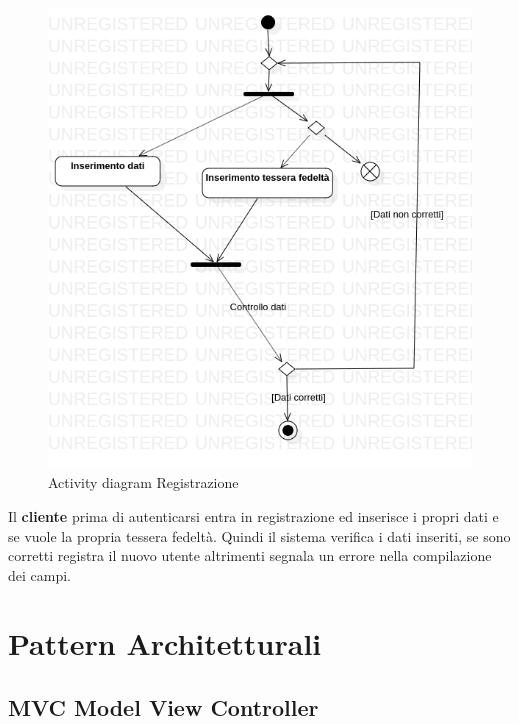 \documentclass[12pt, a4paper]{report}
\begin{document}
\begin{figure}[H]
  \centering
  \includegraphics[width=\textwidth]{Use Case Model!Registrazione!ActivityRegistrazione!ActivityDiagramRegistrazione_2.png}
  \caption{Activity diagram Registrazione}
\end{figure}

Il \textbf{cliente} prima di autenticarsi entra in registrazione ed inserisce i propri dati e se vuole la propria tessera fedeltà. 
Quindi il sistema verifica i dati inseriti, se sono corretti registra il nuovo utente altrimenti segnala un errore nella compilazione dei campi.

\section{Pattern Architetturali}

\subsection{MVC Model View Controller}
\end{document}
